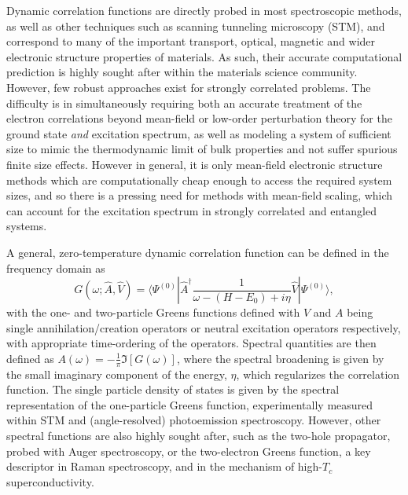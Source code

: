 \documentclass[aps,showpacs,twocolumn,nobibnotes]{revtex4}
\begin{document}
Dynamic correlation functions are directly probed in most spectroscopic methods, as well as other techniques such as scanning tunneling microscopy (STM), 
and correspond to many of the important transport, optical, magnetic and wider electronic structure properties of materials. 
As such, their accurate computational prediction is highly sought after within the materials science community. 
However, few robust approaches exist for strongly correlated problems\cite{Gali2013}. The difficulty is in simultaneously requiring both an accurate 
treatment of the electron correlations beyond mean-field or low-order perturbation theory for the ground state {\em and} excitation spectrum, as well as modeling 
a system of sufficient size to mimic the thermodynamic limit of bulk properties and not suffer spurious finite size effects. 
However in general, it is only mean-field electronic structure methods which are computationally cheap enough to access the required system
sizes, and so there is a pressing need for methods with mean-field scaling, which can account for the excitation spectrum in strongly correlated 
and entangled systems.

A general, zero-temperature dynamic correlation function can be defined in the frequency domain as
\begin{equation}
    G(\omega;{\hat A},{\hat V}) = \langle \Psi^{(0)} | {\hat A}^{\dagger} \frac{1}{\omega-(H-E_0)+i \eta} {\hat V} | \Psi^{(0)} \rangle , \label{eqn:intCorrFunc}
\end{equation}
with the one- and two-particle Greens functions defined with $V$ and $A$ being single annihilation/creation operators or neutral excitation
operators respectively, with appropriate time-ordering of the operators. Spectral quantities are then defined as $A(\omega)=-\frac{1}{\pi}\Im[G(\omega)]$,
where the spectral broadening is given by the small imaginary component of the energy, $\eta$, which regularizes the correlation function. The single particle
density of states is given by the spectral representation of the one-particle Greens function, experimentally measured within STM 
and (angle-resolved) photoemission spectroscopy. However, other spectral functions are also highly sought after, such as the two-hole propagator, 
probed with Auger spectroscopy\cite{Mona2013}, or the two-electron Greens function, a key descriptor in Raman spectroscopy, and in the 
mechanism of high-$T_c$ superconductivity\cite{Millis2012,Millis2013}.
\end{document}
